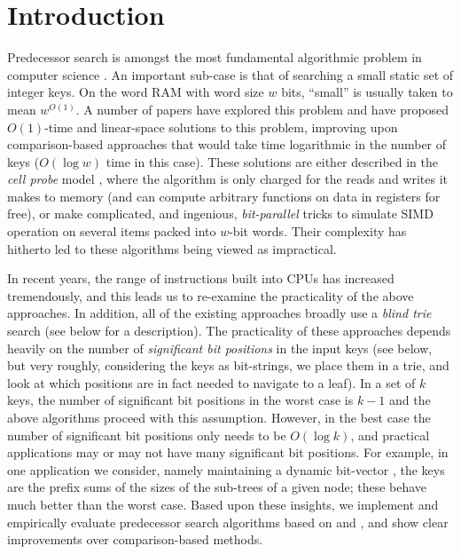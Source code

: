 \section{Introduction}
\label{sec:Introduction}
Predecessor search is amongst the most fundamental algorithmic problem in computer science \cite{Degermark_1997}. An important sub-case is that of searching a small static set of integer keys.  On the word RAM with word size $w$ bits, ``small'' is usually taken to mean $w^{O(1)}$.  A number of papers have explored this problem \cite{AJTAI1984217,FREDMAN1993424, Patrascu_2014} and have proposed $O(1)$-time and linear-space solutions to this problem, improving upon comparison-based approaches that would take time logarithmic in the number of keys ($O(\log w)$ time in this case). These solutions are either described in the \emph{cell probe} model \cite{AJTAI1984217}, where the algorithm is only charged for the reads and writes it makes to memory (and can compute arbitrary functions on data in registers for free), or make complicated, and ingenious, \textit{bit-parallel} tricks to simulate SIMD operation on several items packed into $w$-bit words. Their complexity has hitherto led to these algorithms being viewed as impractical.\par
In recent years, the range of instructions built into CPUs has increased tremendously, and this leads us to re-examine the practicality of the above approaches. In addition, all of the existing approaches broadly use a \textit{blind trie} search (see below for a description). The  practicality of these approaches depends heavily on the number of \emph{significant bit positions} in the input keys (see below, but very roughly, considering the keys as bit-strings, we place them in a trie, and look at which positions are in fact needed to navigate to a leaf).  In a set of $k$ keys, the number of 
 significant bit positions in the worst case is $k-1$ and the above algorithms proceed with this assumption.  However, in the best case the number of significant bit positions only needs to be $O(\log k)$, and practical applications may or may not have many significant bit positions.  For example, in one application we consider, namely maintaining a dynamic bit-vector \cite{Prezza17}, the keys are the prefix sums of the sizes of the sub-trees of a given node; these behave much better than the worst case. Based upon these insights, we implement and empirically evaluate predecessor search algorithms based on \cite{AJTAI1984217} and \cite{FREDMAN1993424}, and show clear improvements over comparison-based methods.\par


